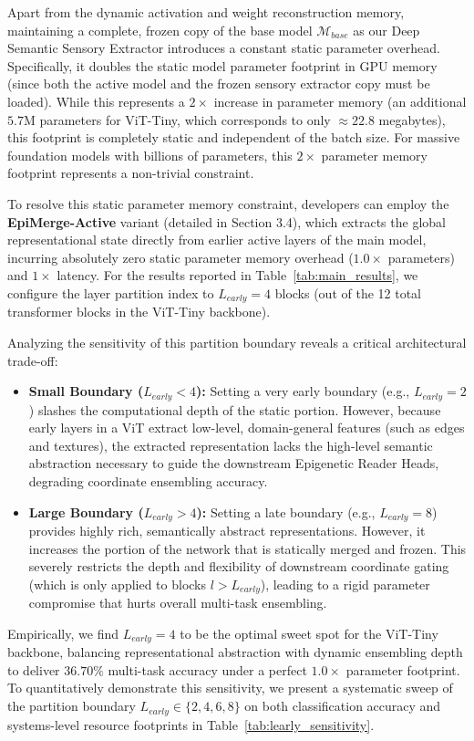 Apart from the dynamic activation and weight reconstruction memory, maintaining a complete, frozen copy of the base model $\mathcal{M}_{base}$ as our Deep Semantic Sensory Extractor introduces a constant static parameter overhead. Specifically, it doubles the static model parameter footprint in GPU memory (since both the active model and the frozen sensory extractor copy must be loaded). While this represents a $2\times$ increase in parameter memory (an additional $5.7$M parameters for ViT-Tiny, which corresponds to only $\approx 22.8$ megabytes), this footprint is completely static and independent of the batch size. For massive foundation models with billions of parameters, this $2\times$ parameter memory footprint represents a non-trivial constraint. 

To resolve this static parameter memory constraint, developers can employ the \textbf{EpiMerge-Active} variant (detailed in Section 3.4), which extracts the global representational state directly from earlier active layers of the main model, incurring absolutely zero static parameter memory overhead ($1.0\times$ parameters) and $1\times$ latency. For the results reported in Table~\ref{tab:main_results}, we configure the layer partition index to $L_{early}=4$ blocks (out of the 12 total transformer blocks in the ViT-Tiny backbone). 

Analyzing the sensitivity of this partition boundary reveals a critical architectural trade-off:
\begin{itemize}
    \item \textbf{Small Boundary ($L_{early} < 4$):} Setting a very early boundary (e.g., $L_{early}=2$) slashes the computational depth of the static portion. However, because early layers in a ViT extract low-level, domain-general features (such as edges and textures), the extracted representation lacks the high-level semantic abstraction necessary to guide the downstream Epigenetic Reader Heads, degrading coordinate ensembling accuracy.
    \item \textbf{Large Boundary ($L_{early} > 4$):} Setting a late boundary (e.g., $L_{early}=8$) provides highly rich, semantically abstract representations. However, it increases the portion of the network that is statically merged and frozen. This severely restricts the depth and flexibility of downstream coordinate gating (which is only applied to blocks $l > L_{early}$), leading to a rigid parameter compromise that hurts overall multi-task ensembling.
\end{itemize}
Empirically, we find $L_{early}=4$ to be the optimal sweet spot for the ViT-Tiny backbone, balancing representational abstraction with dynamic ensembling depth to deliver $36.70\%$ multi-task accuracy under a perfect $1.0\times$ parameter footprint. To quantitatively demonstrate this sensitivity, we present a systematic sweep of the partition boundary $L_{early} \in \{2, 4, 6, 8\}$ on both classification accuracy and systems-level resource footprints in Table~\ref{tab:learly_sensitivity}.

